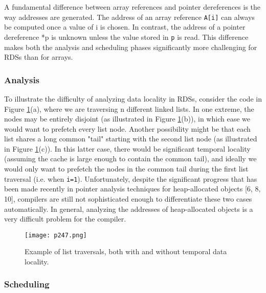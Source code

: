 A fundamental difference between array references and pointer
dereferences is the way addresses are generated. The address of
an array reference \texttt{A[i]} can always be computed once a value of
i is chosen. In contrast, the address of a pointer dereference *p
is unknown unless the value stored in \texttt{p} is read. This difference
makes both the analysis and scheduling phases significantly more
challenging for RDSs than for arrays.


\subsubsection{Analysis}
To illustrate the difficulty of analyzing data locality in RDSs,
consider the code in Figure \ref{fig:p247}(a), where we are traversing n different linked lists. In one extreme, the nodes may be entirely
disjoint (as illustrated in Figure \ref{fig:p247}(b)), in which ease we would
want to prefetch every list node. Another possibility might be
that each list shares a long common "tail" starting with the second list node (as illustrated in Figure \ref{fig:p247}(c)). In this latter case,
there would be significant temporal locality (assuming the cache
is large enough to contain the common tail), and ideally we would
only want to prefetch the nodes in the common tail during the
first list traversal (i.e. when \texttt{i=1}). Unfortunately, despite the
significant progress that has been made recently in pointer analysis techniques for heap-allocated objects [6, 8, 10], compilers are
still not sophisticated enough to differentiate these two cases automatically. In general, analyzing the addresses of heap-allocated
objects is a very difficult problem for the compiler.




\begin{figure}[H]
    \centering
    \texttt{[image: p247.png]}
    \caption{Example of list traversals, both with and without temporal data locality. }
    \label{fig:p247}
\end{figure}



\subsubsection{Scheduling}

